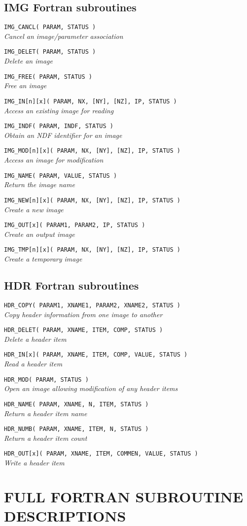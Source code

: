 \documentclass[twoside,11pt,nolof]{starlink}
\providecommand{\latexonlysubsection}[1]{\subsection{#1}}
\begin{document}
  \providecommand{\noteroutine}[3]{\item {\small\texttt{#1#2}} \nopagebreak \\
                                \hspace*{3em}\textit{#3} }
  {\small
  \latexonlysubsection{IMG Fortran subroutines}
  \begin{description}
    \noteroutine{IMG\_CANCL} {( PARAM, STATUS )}
       {Cancel an image/parameter association}
    \noteroutine{IMG\_DELET} {( PARAM, STATUS )}
       {Delete an image}
    \noteroutine{IMG\_FREE} {( PARAM, STATUS )}
       {Free an image}
    \noteroutine{IMG\_IN[n][x]} {( PARAM, NX, [NY], [NZ], IP, STATUS )}
       {Access an existing image for reading}
    \noteroutine{IMG\_INDF} {( PARAM, INDF, STATUS )}
       {Obtain an NDF identifier for an image}
    \noteroutine{IMG\_MOD[n][x]} {( PARAM, NX, [NY], [NZ], IP, STATUS )}
       {Access an image for modification}
    \noteroutine{IMG\_NAME} {( PARAM, VALUE, STATUS )}
       {Return the image name}
    \noteroutine{IMG\_NEW[n][x]} {( PARAM, NX, [NY], [NZ], IP, STATUS )}
       {Create a new image}
    \noteroutine{IMG\_OUT[x]} {( PARAM1, PARAM2, IP, STATUS )}
       {Create an output image}
    \noteroutine{IMG\_TMP[n][x]} {( PARAM, NX, [NY], [NZ], IP, STATUS )}
       {Create a temporary image}
  \end{description}

  \latexonlysubsection{HDR Fortran subroutines}
  \begin{description}
    \noteroutine{HDR\_COPY}{( PARAM1, XNAME1, PARAM2, XNAME2, STATUS )}
       {Copy header information from one image to another}
    \noteroutine{HDR\_DELET}{( PARAM, XNAME, ITEM, COMP, STATUS )}
       {Delete a header item}
    \noteroutine{HDR\_IN[x]}{( PARAM, XNAME, ITEM, COMP, VALUE, STATUS )}
       {Read a header item}
    \noteroutine{HDR\_MOD}{( PARAM, STATUS )}
       {Open an image allowing modification of any header items}
    \noteroutine{HDR\_NAME}{( PARAM, XNAME, N, ITEM, STATUS )}
       {Return a header item name}
    \noteroutine{HDR\_NUMB}{( PARAM, XNAME, ITEM, N, STATUS )}
       {Return a header item count}
    \noteroutine{HDR\_OUT[x]}{( PARAM, XNAME, ITEM, COMMEN, VALUE, STATUS )}
       {Write a header item}
  \end{description}
  } %

\newpage
\section{FULL \label{IMGDESCRIPTIONS} FORTRAN SUBROUTINE DESCRIPTIONS}
\end{document}
